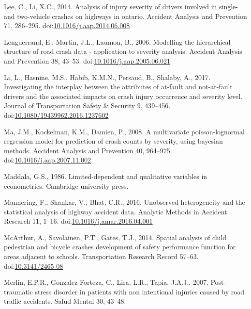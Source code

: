 \documentclass[]{elsarticle} %
\begin{document}
\leavevmode\hypertarget{ref-Lee2014analysis}{}%
Lee, C., Li, X.C., 2014. Analysis of injury severity of drivers involved
in single- and two-vehicle crashes on highways in ontario. Accident
Analysis and Prevention 71, 286--295.
doi:\href{https://doi.org/10.1016/j.aap.2014.06.008}{10.1016/j.aap.2014.06.008}

\leavevmode\hypertarget{ref-Lenguerrand2006modelling}{}%
Lenguerrand, E., Martin, J.L., Laumon, B., 2006. Modelling the
hierarchical structure of road crash data - application to severity
analysis. Accident Analysis and Prevention 38, 43--53.
doi:\href{https://doi.org/10.1016/j.aap.2005.06.021}{10.1016/j.aap.2005.06.021}

\leavevmode\hypertarget{ref-Li2017interplay}{}%
Li, L., Hasnine, M.S., Habib, K.M.N., Persaud, B., Shalaby, A., 2017.
Investigating the interplay between the attributes of at-fault and
not-at-fault drivers and the associated impacts on crash injury
occurrence and severity level. Journal of Transportation Safety \&
Security 9, 439--456.
doi:\href{https://doi.org/10.1080/19439962.2016.1237602}{10.1080/19439962.2016.1237602}

\leavevmode\hypertarget{ref-Ma2008multivariate}{}%
Ma, J.M., Kockelman, K.M., Damien, P., 2008. A multivariate
poisson-lognormal regression model for prediction of crash counts by
severity, using bayesian methods. Accident Analysis and Prevention 40,
964--975.
doi:\href{https://doi.org/10.1016/j.aap.2007.11.002}{10.1016/j.aap.2007.11.002}

\leavevmode\hypertarget{ref-Maddala1986limited}{}%
Maddala, G.S., 1986. Limited-dependent and qualitative variables in
econometrics. Cambridge university press.

\leavevmode\hypertarget{ref-Mannering2016unobserved}{}%
Mannering, F., Shankar, V., Bhat, C.R., 2016. Unobserved heterogeneity
and the statistical analysis of highway accident data. Analytic Methods
in Accident Research 11, 1--16.
doi:\href{https://doi.org/10.1016/j.amar.2016.04.001}{10.1016/j.amar.2016.04.001}

\leavevmode\hypertarget{ref-McArthur2014spatial}{}%
McArthur, A., Savolainen, P.T., Gates, T.J., 2014. Spatial analysis of
child pedestrian and bicycle crashes development of safety performance
function for areas adjacent to schools. Transportation Research Record
57--63. doi:\href{https://doi.org/10.3141/2465-08}{10.3141/2465-08}

\leavevmode\hypertarget{ref-Merlin2007stress}{}%
Merlin, E.P.R., Gonzalez-Forteza, C., Lira, L.R., Tapia, J.A.J., 2007.
Post-traumatic stress disorder in patients with non intentional injuries
caused by road traffic accidents. Salud Mental 30, 43--48.
\end{document}
